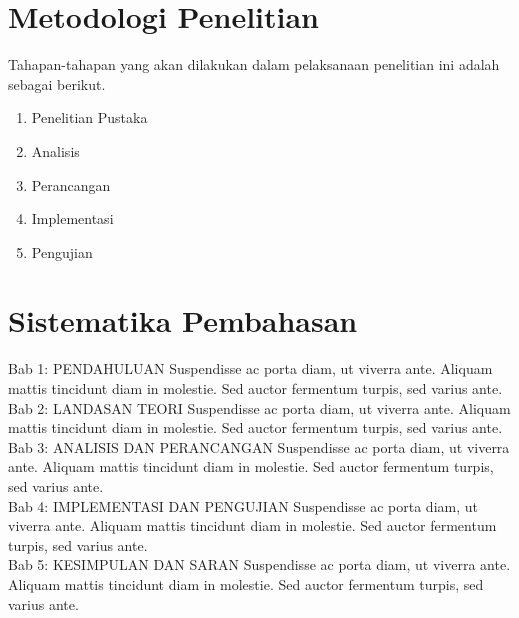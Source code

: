 \section{Metodologi Penelitian}
Tahapan-tahapan yang akan dilakukan dalam pelaksanaan penelitian ini adalah sebagai berikut.
\begin{enumerate}[nolistsep,leftmargin=0.5cm]
  \item Penelitian Pustaka
  \item Analisis
  \item Perancangan
  \item Implementasi
  \item Pengujian \\
\end{enumerate}

\section{Sistematika Pembahasan}
Bab 1: PENDAHULUAN
Suspendisse ac porta diam, ut viverra ante. Aliquam mattis tincidunt diam in molestie. Sed auctor fermentum turpis, sed varius ante.\\

Bab 2: LANDASAN TEORI
Suspendisse ac porta diam, ut viverra ante. Aliquam mattis tincidunt diam in molestie. Sed auctor fermentum turpis, sed varius ante.\\

Bab 3: ANALISIS DAN PERANCANGAN
Suspendisse ac porta diam, ut viverra ante. Aliquam mattis tincidunt diam in molestie. Sed auctor fermentum turpis, sed varius ante.\\

Bab 4: IMPLEMENTASI DAN PENGUJIAN
Suspendisse ac porta diam, ut viverra ante. Aliquam mattis tincidunt diam in molestie. Sed auctor fermentum turpis, sed varius ante.\\

Bab 5: KESIMPULAN DAN SARAN
Suspendisse ac porta diam, ut viverra ante. Aliquam mattis tincidunt diam in molestie. Sed auctor fermentum turpis, sed varius ante.\\